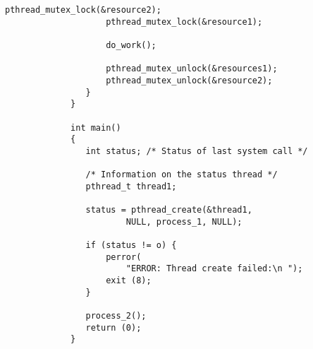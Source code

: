 \begin{LTR}
\begin{lstlisting}[style=C++Style]
             		pthread_mutex_lock(&resource2);
             		pthread_mutex_lock(&resource1);

             		do_work();

             		pthread_mutex_unlock(&resources1);
             		pthread_mutex_unlock(&resource2);
             	}
             }

             int main()
             {
             	int status; /* Status of last system call */

             	/* Information on the status thread */
             	pthread_t thread1;

             	status = pthread_create(&thread1,
             			NULL, process_1, NULL);

             	if (status != o) {
             		perror(
             			"ERROR: Thread create failed:\n ");
             		exit (8);
             	}

             	process_2();
             	return (0);
             }
        \end{lstlisting}
\end{LTR}
